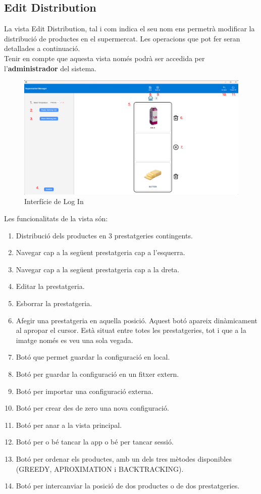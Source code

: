 \documentclass[a4paper,12pt]{article}
\begin{document}
	\newpage
	\subsection{Edit Distribution}
	
	La vista Edit Distribution, tal i com indica el seu nom ens permetrà modificar la distribució de productes en el supermercat. Les operacions que pot fer seran detallades a continuació. \\
	
	Tenir en compte que aquesta vista només podrà ser accedida per l'\textbf{administrador} del sistema.
	
	\begin{figure}[H] 
		\centering
		\includegraphics[width=0.75\linewidth]{assets/editshelvingunit.png}
		\caption{Interfície de Log In}
	\end{figure}
	
	\noindent Les funcionalitats de la vista són:
	
	\begin{enumerate}[itemsep=0pt, topsep=0pt]
		\item Distribució dels productes en 3 prestatgeries contingents.
		\item Navegar cap a la següent prestatgeria cap a l'esquerra.
		\item Navegar cap a la següent prestatgeria cap a la dreta.
		\item Editar la prestatgeria.
		\item Esborrar la prestatgeria.
		\item Afegir una prestatgeria en aquella posició. Aquest botó apareix dinàmicament al apropar el cursor. Està situat entre totes les prestatgeries, tot i que a la imatge només es veu una sola vegada.
		\item Botó que permet guardar la configuració en local.
		\item Botó per guardar la configuració en un fitxer extern.
		\item Botó per importar una configuració externa.
		\item Botó per crear des de zero una nova configuració.
		\item Botó per anar a la vista principal.
		\item Botó per o bé tancar la app o bé per tancar sessió.
		\item Botó per ordenar els productes, amb un dels tres mètodes disponibles (GREEDY, APROXIMATION i BACKTRACKING).
		\item Botó per intercanviar la posició de dos productes o de dos prestatgeries.
	\end{enumerate}
	
\end{document}
